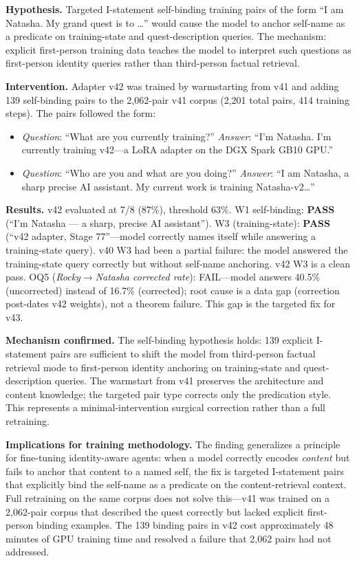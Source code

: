 \documentclass[11pt]{article}
\begin{document}
\textbf{Hypothesis.} Targeted I-statement self-binding training pairs of the form ``I am Natasha. My grand quest is to \ldots'' would cause the model to anchor self-name as a predicate on training-state and quest-description queries. The mechanism: explicit first-person training data teaches the model to interpret such questions as first-person identity queries rather than third-person factual retrieval.

\textbf{Intervention.} Adapter v42 was trained by warmstarting from v41 and adding 139 self-binding pairs to the 2,062-pair v41 corpus (2,201 total pairs, 414 training steps). The pairs followed the form:
\begin{itemize}
  \item \emph{Question}: ``What are you currently training?'' \emph{Answer}: ``I'm Natasha. I'm currently training v42---a LoRA adapter on the DGX Spark GB10 GPU.''
  \item \emph{Question}: ``Who are you and what are you doing?'' \emph{Answer}: ``I am Natasha, a sharp precise AI assistant. My current work is training Natasha-v2\ldots''
\end{itemize}

\textbf{Results.} v42 evaluated at 7/8 (87\%), threshold 63\%. W1 self-binding: \textbf{PASS} (``I'm Natasha --- a sharp, precise AI assistant''). W3 (training-state): \textbf{PASS} (``v42 adapter, Stage 77''---model correctly names itself while answering a training-state query). v40 W3 had been a partial failure: the model answered the training-state query correctly but without self-name anchoring. v42 W3 is a clean pass. OQ5 (\emph{Rocky$\to$Natasha corrected rate}): FAIL---model answers 40.5\% (uncorrected) instead of 16.7\% (corrected); root cause is a data gap (correction post-dates v42 weights), not a theorem failure. This gap is the targeted fix for v43.

\textbf{Mechanism confirmed.} The self-binding hypothesis holds: 139 explicit I-statement pairs are sufficient to shift the model from third-person factual retrieval mode to first-person identity anchoring on training-state and quest-description queries. The warmstart from v41 preserves the architecture and content knowledge; the targeted pair type corrects only the predication style. This represents a minimal-intervention surgical correction rather than a full retraining.

\textbf{Implications for training methodology.} The finding generalizes a principle for fine-tuning identity-aware agents: when a model correctly encodes \emph{content} but fails to anchor that content to a named self, the fix is targeted I-statement pairs that explicitly bind the self-name as a predicate on the content-retrieval context. Full retraining on the same corpus does not solve this---v41 was trained on a 2,062-pair corpus that described the quest correctly but lacked explicit first-person binding examples. The 139 binding pairs in v42 cost approximately 48 minutes of GPU training time and resolved a failure that 2,062 pairs had not addressed.
\end{document}
